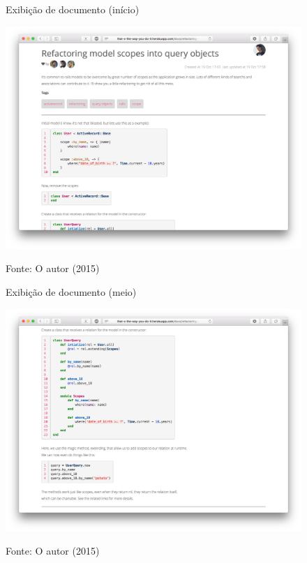 \begin{figure}[h]
	\centering
    \caption{Exibição de documento (início)}
    \includegraphics[width=15cm]{Imagens/print-show-1.png}
    \label{fig:doc-show-1}
	\caption*{Fonte: O autor (2015)}
\end{figure}


\begin{figure}[h]
	\centering
    \caption{Exibição de documento (meio)}
    \includegraphics[width=15cm]{Imagens/print-show-2.png}
    \label{fig:doc-show-2}
	\caption*{Fonte: O autor (2015)}
\end{figure}

